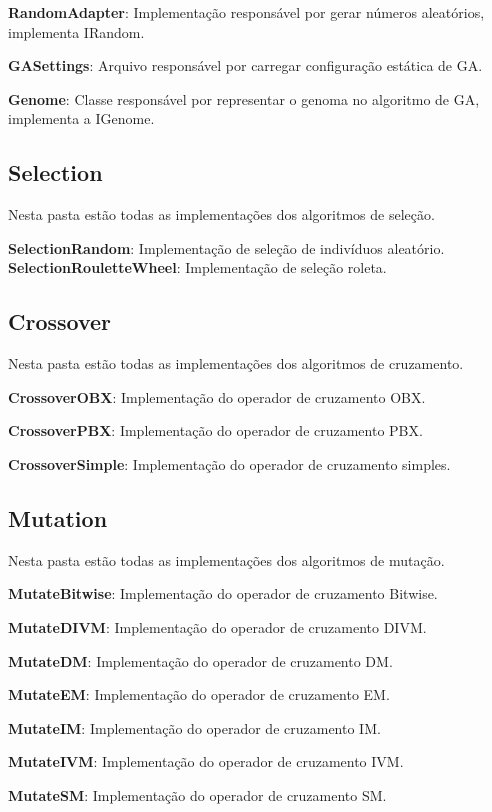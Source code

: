 \textbf{RandomAdapter}: Implementação responsável por gerar números aleatórios, implementa IRandom.

\textbf{GASettings}: Arquivo responsável por carregar configuração estática de GA.

\textbf{Genome}: Classe responsável por representar o genoma no algoritmo de GA, implementa a IGenome.

\subsection{Selection}

Nesta pasta estão todas as implementações dos algoritmos de seleção.

\textbf{SelectionRandom}: Implementação de seleção de indivíduos aleatório.
\textbf{SelectionRouletteWheel}: Implementação de seleção roleta.

\subsection{Crossover}

Nesta pasta estão todas as implementações dos algoritmos de cruzamento.

\textbf{CrossoverOBX}: Implementação do operador de cruzamento OBX.

\textbf{CrossoverPBX}: Implementação do operador de cruzamento PBX.

\textbf{CrossoverSimple}:  Implementação do operador de cruzamento simples.

\subsection{Mutation}

Nesta pasta estão todas as implementações dos algoritmos de mutação.

\textbf{MutateBitwise}: Implementação do operador de cruzamento Bitwise.

\textbf{MutateDIVM}: Implementação do operador de cruzamento DIVM.

\textbf{MutateDM}: Implementação do operador de cruzamento DM.

\textbf{MutateEM}: Implementação do operador de cruzamento EM.

\textbf{MutateIM}: Implementação do operador de cruzamento IM.

\textbf{MutateIVM}: Implementação do operador de cruzamento IVM.

\textbf{MutateSM}: Implementação do operador de cruzamento SM.

